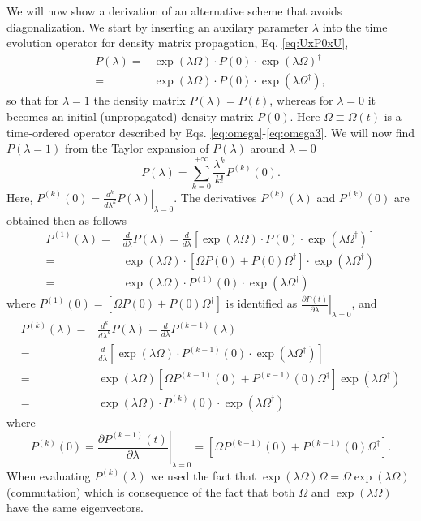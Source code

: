 \documentclass[journal=jctcce,manuscript=article,etalmode=truncate,maxauthors=10,layout=twocolumn,9pt]{achemso}   %
\begin{document}
We will now show a derivation of an alternative scheme that avoids diagonalization.
We start by inserting an auxilary parameter $\lambda$ into the time evolution operator for  density matrix 
propagation, Eq. \ref{eq:UxP0xU},  
\begin{align} 
P(\lambda) =& \exp(\lambda \Omega) \cdot P(0)\cdot \exp(\lambda \Omega)^\dag \\ \nonumber 
  =&  \exp(\lambda \Omega) \cdot P(0)\cdot \exp(\lambda \Omega^\dag ),
\label{eq:P-propagation}
\end{align}
so that  for $\lambda=1$ the density matrix $P(\lambda)=P(t)$, whereas for  $\lambda=0$  it becomes
 an initial (unpropagated) density matrix $P(0)$.
Here $\Omega \equiv   \Omega(t)$  is  a time-ordered operator  described  by Eqs.  \ref{eq:omega}-\ref{eq:omega3}.
We will now find  $P(\lambda=1)$ from the  Taylor expansion of  $P(\lambda)$  around  $\lambda=0$
\begin{equation}
P(\lambda)  = \sum_{k=0}^{+\infty}  \frac{\lambda^k}{k!} 
  P^{(k)} (0). 
\label{eq:Taylor}
\end{equation}
Here,  $P^{(k)}(0) = \left.\frac{d^k}{d\lambda^k}  P(\lambda) \right|_{\lambda=0}$.
The  derivatives  $ P^{(k)} (\lambda)$  and  $ P^{(k)} (0)$ are obtained then as follows 
\begin{align}
P^{(1)}(\lambda) =& 
 \frac{d}{d\lambda} P(\lambda)
 = \frac{d}{d\lambda} [ \exp(\lambda \Omega) \cdot P(0)\cdot \exp(\lambda \Omega^\dag )]  \nonumber \\
 =& \exp(\lambda \Omega) \cdot [ \Omega P(0)+ P(0) \Omega^\dag] \cdot \exp(\lambda \Omega^\dag )  \nonumber \\
 =& \exp(\lambda \Omega) \cdot  P^{(1)}(0) \cdot \exp(\lambda \Omega^\dag ) 
\label{eq:Taylor-1}
\end{align}
where  $P^{(1)}(0) = [\Omega P(0)+ P(0) \Omega^\dag]$
is identified %
as  $\left. \frac{\partial P(t)}{\partial \lambda}\right|_{\lambda=0}$,  
and 
\begin{align}
P^{(k)}(\lambda) =& \frac{d^k}{d\lambda^k} P(\lambda)   =
  \frac{d}{d\lambda} P^{(k-1)}(\lambda)  \nonumber  \\
 =& \frac{d}{d\lambda} [ \exp(\lambda \Omega) \cdot P^{(k-1)}(0)\cdot \exp(\lambda \Omega^\dag )]  \nonumber \\
 =& \exp(\lambda \Omega)  [ \Omega P^{(k-1)} (0)+ P^{(k-1)}(0) \Omega^\dag]  \exp(\lambda \Omega^\dag )  \nonumber \\
 =& \exp(\lambda \Omega) \cdot  P^{(k)}(0) \cdot \exp(\lambda \Omega^\dag ) 
\end{align}
 where 
\begin{equation}
P^{(k)}(0) = \left.\frac{\partial P^{(k-1)}(t)}{\partial \lambda}\right|_{\lambda=0}
           = [\Omega P^{(k-1)} (0)+ P^{(k-1)}(0) \Omega^\dag]. 
\label{eq:Taylor-k}
\end{equation}
When evaluating $P^{(k)}(\lambda)$ we used the fact that
 $\exp(\lambda \Omega) \Omega  =  \Omega  \exp(\lambda \Omega)$ 
(commutation)  which is consequence of the fact that both  $\Omega$ and  $\exp(\lambda \Omega)$  have the same
 eigenvectors.
\end{document}
